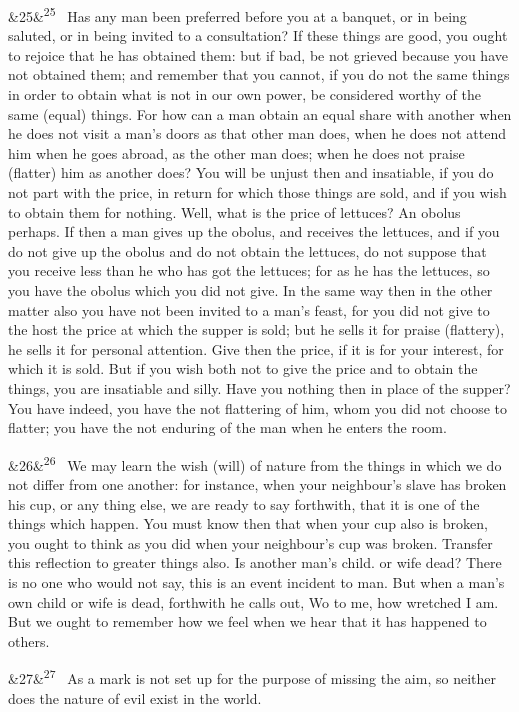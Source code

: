 \documentclass[12pt]{article}
\newcommand{\para}[1][]{\par\noindent\ifx&#1&\else\textsuperscript{\footnotesize #1}~\fi}
\begin{document}
\para[25] Has any man been preferred before you at a banquet, or in being saluted, or in being invited to a consultation? If these things are good, you ought to rejoice that he has obtained them: but if bad, be not grieved because you have not obtained them; and remember that you cannot, if you do not the same things in order to obtain what is not in our own power, be considered worthy of the same (equal) things. For how can a man obtain an equal share with another when he does not visit a man's doors as that other man does, when he does not attend him when he goes abroad, as the other man does; when he does not praise (flatter) him as another does? You will be unjust then and insatiable, if you do not part with the price, in return for which those things are sold, and if you wish to obtain them for nothing. Well, what is the price of lettuces? An obolus perhaps. If then a man gives up the obolus, and receives the lettuces, and if you do not give up the obolus and do not obtain the lettuces, do not suppose that you receive less than he who has got the lettuces; for as he has the lettuces, so you have the obolus which you did not give. In the same way then in the other matter also you have not been invited to a man's feast, for you did not give to the host the price at which the supper is sold; but he sells it for praise (flattery), he sells it for personal attention. Give then the price, if it is for your interest, for which it is sold. But if you wish both not to give the price and to obtain the things, you are insatiable and silly. Have you nothing then in place of the supper? You have indeed, you have the not flattering of him, whom you did not choose to flatter; you have the not enduring of the man when he enters the room.

\para[26] We may learn the wish (will) of nature from the things in which we do not differ from one another: for instance, when your neighbour's slave has broken his cup, or any thing else, we are ready to say forthwith, that it is one of the things which happen. You must know then that when your cup also is broken, you ought to think as you did when your neighbour's cup was broken. Transfer this reflection to greater things also. Is another man's child. or wife dead? There is no one who would not say, this is an event incident to man. But when a man's own child or wife is dead, forthwith he calls out, Wo to me, how wretched I am. But we ought to remember how we feel when we hear that it has happened to others.

\para[27] As a mark is not set up for the purpose of missing the aim, so neither does the nature of evil exist in the world.
\end{document}
